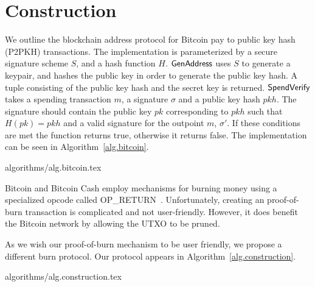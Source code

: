 \section{Construction}\label{section:construction}

We outline the blockchain address protocol for Bitcoin pay to public key hash (P2PKH) transactions. The implementation is parameterized by a secure signature scheme $S$, and a hash function $H$.
$\mathsf{GenAddress}$ uses $S$ to generate a keypair, and hashes the public key in order to generate the public key hash. A tuple consisting of the public key hash and the secret key is returned.
$\mathsf{SpendVerify}$ takes a spending transaction $m$, a signature $\sigma$ and a public key hash $pkh$. The signature should contain the public key $pk$ corresponding to $pkh$ such that $H(pk) = pkh$ and a valid signature for the outpoint $m$, $\sigma'$. If these conditions are met the function returns true, otherwise it returns false.
The implementation can be seen in Algorithm~\ref{alg.bitcoin}.

{algorithms/alg.bitcoin.tex}


Bitcoin and Bitcoin Cash employ mechanisms for burning money using a specialized
opcode called \textsf{OP\_RETURN}~\cite{bartoletti2017analysis}. Unfortunately,
creating an  proof-of-burn transaction is complicated and not
user-friendly. However, it does benefit the Bitcoin network by allowing the UTXO
to be pruned.

As we wish our proof-of-burn mechanism to be user friendly, we propose a
different burn protocol. Our protocol appears in
Algorithm~\ref{alg.construction}.

{algorithms/alg.construction.tex}
